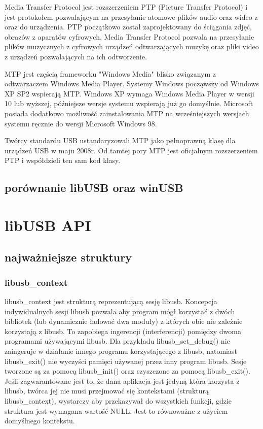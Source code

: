 \documentclass{BscUS}
\begin{document}
Media Transfer Protocol jest rozszerzeniem PTP (Picture Transfer Protocol) i jest protokołem pozwalającym na przesyłanie atomowe plików audio oraz wideo z oraz do urządzenia. PTP początkowo został zaprojektowany do ściągania zdjęć, obrazów z aparatów cyfrowych, Media Transfer Protocol pozwala na przesyłanie plików muzycznych z cyfrowych urządzeń odtwarzających muzykę oraz pliki video z urządzeń pozwalających na ich odtworzenie.

 

MTP jest częścią frameworku "Windows Media" blisko związanym z odtwarzaczem Windows Media Player. Systemy Windows począwszy od Windows XP SP2 wspierają MTP. Windows XP wymaga Windows Media Player w wersji 10 lub wyższej, późniejsze wersje systemu wspierają już go domyślnie. Microsoft posiada dodatkowo możliwość zainstalowania MTP na wcześniejszych wersjach systemu ręcznie do wersji Microsoft Windows 98.

Twórcy standardu USB ustandaryzowali MTP jako pełnoprawną klasę dla urządzeń USB w maju 2008r.
Od tamtej pory MTP jest oficjalnym rozszerzeniem PTP i współdzieli ten sam kod klasy. %



\section{porównanie libUSB oraz winUSB}

\newpage

\chapter{libUSB API}
\label{libUsbChapter}

\section{najważniejsze struktury}
\subsection{libusb\_context}
libusb\_context jest strukturą reprezentującą sesję libusb.
\newline
Koncepcja indywidualnych sesji libusb pozwala aby program mógł korzystać z dwóch bibliotek (lub dynamicznie ładować dwa moduły) z których obie nie zależnie korzystają z libusb. To zapobiega ingerencji (interferencji) pomiędzy dwoma programami używającymi libusb. Dla przykładu libusb\_set\_debug() nie zaingeruje w działanie innego programu korzystającego z libusb, natomiast libusb\_exit() nie wyczyści pamięci używanej przez inny program libusb.
\newline
Sesje tworzone są za pomocą libusb\_init() oraz czyszczone za pomocą libusb\_exit(). Jeśli zagwarantowane jest to, że dana aplikacja jest jedyną która korzysta z libusb, twórca jej nie musi przejmować się kontekstami (strukturą libusb\_context), wystarczy aby przekazywał do wszystkich funkcji, gdzie struktura jest wymagana wartość NULL. Jest to równoważne z użyciem domyślnego kontekstu.
\end{document}
